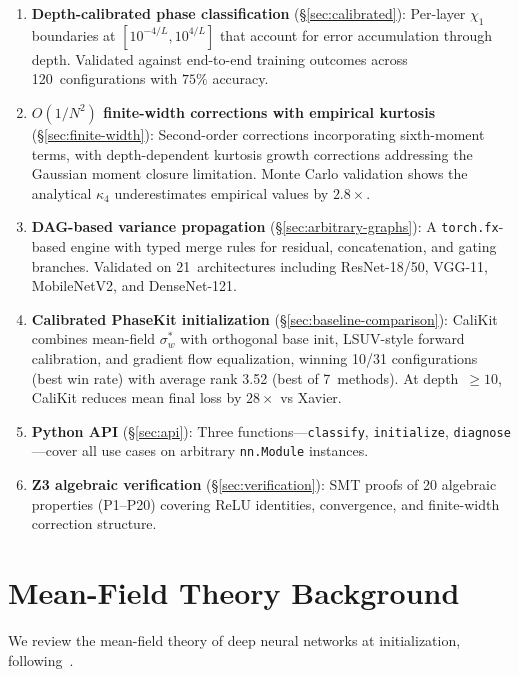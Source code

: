 \documentclass[10pt]{article}
\begin{document}
\begin{enumerate}[nosep]
    \item \textbf{Depth-calibrated phase classification} (\S\ref{sec:calibrated}): Per-layer $\chi_1$ boundaries at $[10^{-4/L}, 10^{4/L}]$ that account for error accumulation through depth. Validated against end-to-end training outcomes across 120~configurations with $75\%$ accuracy.
    \item \textbf{$O(1/N^2)$ finite-width corrections with empirical kurtosis} (\S\ref{sec:finite-width}): Second-order corrections incorporating sixth-moment terms, with depth-dependent kurtosis growth corrections addressing the Gaussian moment closure limitation. Monte Carlo validation shows the analytical $\kappa_4$ underestimates empirical values by $2.8\times$.
    \item \textbf{DAG-based variance propagation} (\S\ref{sec:arbitrary-graphs}): A \texttt{torch.fx}-based engine with typed merge rules for residual, concatenation, and gating branches. Validated on 21~architectures including ResNet-18/50, VGG-11, MobileNetV2, and DenseNet-121.
    \item \textbf{Calibrated PhaseKit initialization} (\S\ref{sec:baseline-comparison}): CaliKit combines mean-field $\sigma_w^*$ with orthogonal base init, LSUV-style forward calibration, and gradient flow equalization, winning 10/31 configurations (best win rate) with average rank 3.52 (best of 7~methods). At depth~$\geq 10$, CaliKit reduces mean final loss by $28\times$ vs Xavier.
    \item \textbf{Python API} (\S\ref{sec:api}): Three functions---\texttt{classify}, \texttt{initialize}, \texttt{diagnose}---cover all use cases on arbitrary \texttt{nn.Module} instances.
    \item \textbf{Z3 algebraic verification} (\S\ref{sec:verification}): SMT proofs of 20 algebraic properties (P1--P20) covering ReLU identities, convergence, and finite-width correction structure.
\end{enumerate}

\section{Mean-Field Theory Background}
\label{sec:mft}

We review the mean-field theory of deep neural networks at initialization, following~\cite{poole2016exponential,schoenholz2017deep}.
\end{document}
